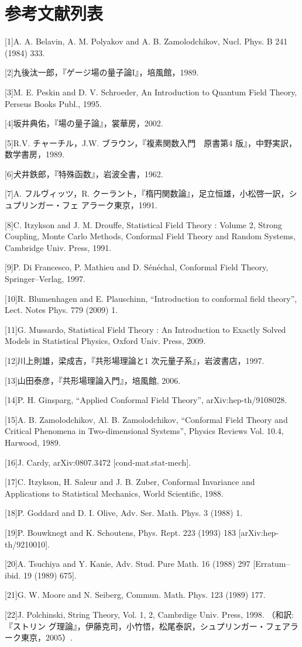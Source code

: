 \section*{参考文献列表}
{\raggedright
[1]A. A. Belavin, A. M. Polyakov and A. B. Zamolodchikov, Nucl. Phys. B 241 (1984) 333.

[2]九後汰一郎，『ゲージ場の量子論I』，培風館，1989.

[3]M. E. Peskin and D. V. Schroeder, An Introduction to Quantum Field Theory, Perseus Books Publ., 1995.

[4]坂井典佑，『場の量子論』，裳華房，2002.

[5]R.V. チャーチル，J.W. ブラウン，『複素関数入門　原書第4 版』，中野実訳，数学書房，1989.

[6]犬井鉄郎，『特殊函数』，岩波全書，1962.

[7]A. フルヴィッツ，R. クーラント，『楕円関数論』，足立恒雄，小松啓一訳，シュプリンガー・フェ アラーク東京，1991.

[8]C. Itzykson and J. M. Drouffe, Statistical Field Theory : Volume 2, Strong Coupling, Monte Carlo Methods, Conformal Field Theory and Random Systems, Cambridge Univ. Press, 1991.

[9]P. Di Francesco, P. Mathieu and D. Sénéchal, Conformal Field Theory, Springer–Verlag, 1997.

[10]R. Blumenhagen and E. Plauschinn, “Introduction to conformal field theory”, Lect. Notes Phys. 779 (2009) 1.

[11]G. Mussardo, Statistical Field Theory : An Introduction to Exactly Solved Models in Statistical Physics, Oxford Univ. Press, 2009.

[12]川上則雄，梁成吉，『共形場理論と1 次元量子系』，岩波書店，1997.

[13]山田泰彦，『共形場理論入門』，培風館, 2006.

[14]P. H. Ginsparg, “Applied Conformal Field Theory”, arXiv:hep-th/9108028.

[15]A. B. Zamolodchikov, Al. B. Zamolodchikov, “Conformal Field Theory and Critical Phenomena in Two-dimensional Systems”, Physics Reviews Vol. 10.4, Harwood, 1989.

[16]J. Cardy, arXiv:0807.3472 [cond-mat.stat-mech].

[17]C. Itzykson, H. Saleur and J. B. Zuber, Conformal Invariance and Applications to Statistical Mechanics, World Scientific, 1988.

[18]P. Goddard and D. I. Olive, Adv. Ser. Math. Phys. 3 (1988) 1.

[19]P. Bouwknegt and K. Schoutens, Phys. Rept. 223 (1993) 183 [arXiv:hep-th/9210010].

[20]A. Tsuchiya and Y. Kanie, Adv. Stud. Pure Math. 16 (1988) 297 [Erratum–ibid. 19 (1989) 675].

[21]G. W. Moore and N. Seiberg, Commun. Math. Phys. 123 (1989) 177.

[22]J. Polchinski, String Theory, Vol. 1, 2, Cambrdige Univ. Press, 1998. （和訳:『ストリン グ理論』，伊藤克司，小竹悟，松尾泰訳，シュプリンガー・フェアラーク東京，2005）.}

